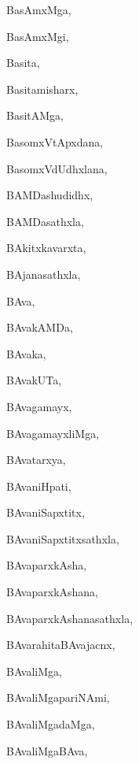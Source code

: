 \begin{multicols}{3}
{\noindent
{BasAmxMga}, \pageref{BasAmxMga}

\noindent
{BasAmxMgi}, \pageref{BasAmxMgi}

\noindent
{Basita}, \pageref{Basita}

\noindent
{Basitamisharx}, \pageref{Basitamisharx}

\noindent
{BasitAMga}, \pageref{BasitAMga}

\noindent
{BasomxVtApxdana}, \pageref{BasomxVtApxdana}

\noindent
{BasomxVdUdhxlana}, \pageref{BasomxVdUdhxlana}

\noindent
{BAMDashudidhx}, \pageref{BAMDashudidhx}

\noindent
{BAMDasathxla}, \pageref{BAMDasathxla}

\noindent
{BAkitxkavarxta}, \pageref{BAkitxkavarxta}

\noindent
{BAjanasathxla}, \pageref{BAjanasathxla}

\noindent
{BAva}, \pageref{BAva}

\noindent
{BAvakAMDa}, \pageref{BAvakAMDa}

\noindent
{BAvaka}, \pageref{BAvaka}

\noindent
{BAvakUTa}, \pageref{BAvakUTa}

\noindent
{BAvagamayx}, \pageref{BAvagamayx}

\noindent
{BAvagamayxliMga}, \pageref{BAvagamayxliMga}

\noindent
{BAvatarxya}, \pageref{BAvatarxya}

\noindent
{BAvaniHpati}, \pageref{BAvaniHpati}

\noindent
{BAvaniSapxtitx}, \pageref{BAvaniSapxtitx}

\noindent
{BAvaniSapxtitxsathxla}, \pageref{BAvaniSapxtitxsathxla}

\noindent
{BAvaparxkAsha}, \pageref{BAvaparxkAsha}

\noindent
{BAvaparxkAshana}, \pageref{BAvaparxkAshana}

\noindent
{BAvaparxkAshanasathxla}, \pageref{BAvaparxkAshanasathxla}

\noindent
{BAvarahitaBAvajacnx}, \pageref{BAvarahitaBAvajacnx}

\noindent
{BAvaliMga}, \pageref{BAvaliMga}

\noindent
{BAvaliMgapariNAmi}, \pageref{BAvaliMgapariNAmi}

\noindent
{BAvaliMgadaMga}, \pageref{BAvaliMgadaMga}

\noindent
{BAvaliMgaBAva}, \pageref{BAvaliMgaBAva}

}
\end{multicols}
